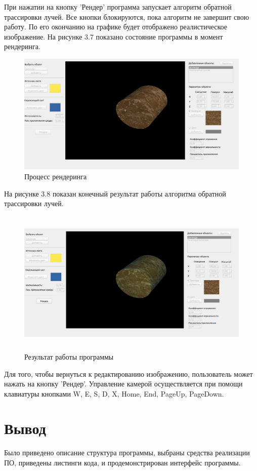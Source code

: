 При нажатии на кнопку 'Рендер' программа запускает алгоритм обратной трассировки лучей.
Все кнопки блокируются, пока алгоритм не завершит свою работу.
По его окончанию на графике будет отображено реалистическое изображение.
На рисунке 3.7 показано состояние программы в момент рендеринга.
\FloatBarrier
\begin{figure}[h]
	\begin{center}
		\includegraphics[width=\linewidth]{inc/lock.png}
	\end{center}
	\caption{Процесс рендеринга}
\end{figure}
\FloatBarrier

На рисунке 3.8 показан конечный результат работы алгоритма обратной трассировки лучей.
\FloatBarrier
\begin{figure}[h]
	\begin{center}
		\includegraphics[height = 7cm, width=15cm]{inc/result.png}
	\end{center}
	\caption{Результат работы программы}
\end{figure}
\FloatBarrier

Для того, чтобы вернуться к редактированию изображению, пользователь может нажать на кнопку 'Рендер'.
Управление камерой осуществляется при помощи клавиатуры кнопками W, E, S, D, X, Home, End, PageUp, PageDown. 

\section{Вывод}
Было приведено описание структура программы, выбраны средства реализации ПО,
приведены листинги кода, и продемонстрирован интерфейс программы.